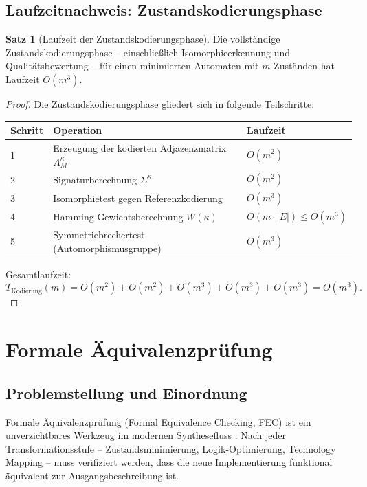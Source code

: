 ﻿\documentclass[a4paper,12pt]{article}
\theoremstyle{definition}
\newtheorem{satz}{Satz}
\begin{document}
\subsection{Laufzeitnachweis: Zustandskodierungsphase}

\begin{satz}[Laufzeit der Zustandskodierungsphase]\label{satz:kodzlaufzeit}
  Die vollständige Zustandskodierungsphase -- einschließlich Isomorphieerkennung und
  Qualitätsbewertung -- für einen minimierten Automaten mit $m$ Zuständen hat Laufzeit
  $O(m^3)$.
\end{satz}

\begin{proof}
  Die Zustandskodierungsphase gliedert sich in folgende Teilschritte:

  \begin{center}
  \begin{tabular}{lll}
    \toprule
    Schritt & Operation & Laufzeit \\
    \midrule
    1 & Erzeugung der kodierten Adjazenzmatrix $A_M^\kappa$ & $O(m^2)$ \\
    2 & Signaturberechnung $\Sigma^\kappa$ & $O(m^2)$ \\
    3 & Isomorphietest gegen Referenzkodierung  & $O(m^3)$ \\
    4 & Hamming-Gewichtsberechnung $W(\kappa)$ & $O(m \cdot |E|) \leq O(m^3)$ \\
    5 & Symmetriebrechertest (Automorphismusgruppe) & $O(m^3)$ \\
    \bottomrule
  \end{tabular}
  \end{center}

  Gesamtlaufzeit:
  \[
    T_{\text{Kodierung}}(m) = O(m^2) + O(m^2) + O(m^3) + O(m^3) + O(m^3) = O(m^3).
  \]
\end{proof}

\section{Formale Äquivalenzprüfung}

\subsection{Problemstellung und Einordnung}

Formale Äquivalenzprüfung (Formal Equivalence Checking, FEC) ist ein unverzichtbares
Werkzeug im modernen Synthesefluss \cite[Kap.~7]{ciletti2011}. Nach jeder
Transformationsstufe -- Zustandsminimierung, Logik-Optimierung, Technology Mapping --
muss verifiziert werden, dass die neue Implementierung funktional äquivalent zur
Ausgangsbeschreibung ist.
\end{document}
